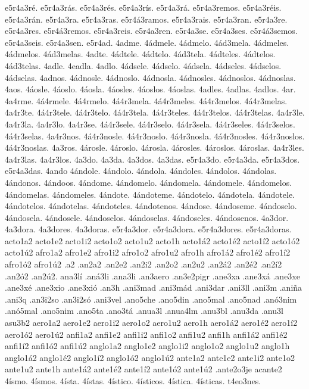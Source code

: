 {e5r4a3ré. e5r4a3rás. e5r4a3rés. e5r4a3rís. e5r4a3rá. e5r4a3remos. e5r4a3réis. e5r4a3rán.
e5r4a3ra. e5r4a3ras. e5r4á3ramos. e5r4a3rais. e5r4a3ran.
e5r4a3re. e5r4a3res. e5r4á3remos. e5r4a3reis. e5r4a3ren.
e5r4a3se. e5r4a3ses. e5r4á3semos. e5r4a3seis. e5r4a3sen.
e5r4ad.
4adme.
4ádmele. 4ádmelo. 4ád3mela.
4ádmeles. 4ádmelos. 4ád3melas.
4adte.
4ádtele. 4ádtelo. 4ád3tela.
4ádteles. 4ádtelos. 4ád3telas.
4adle. 4eadla. 4adlo.
4ádsele. 4ádselo. 4ádsela.
4ádseles. 4ádselos. 4ádselas.
4adnos.
4ádnosle. 4ádnoslo. 4ádnosla.
4ádnosles. 4ádnoslos. 4ádnoslas.
4aos.
4áosle. 4áoslo. 4áosla.
4áosles. 4áoslos. 4áoslas.
4adles. 4adlas. 4adlos.
4ar.
4a4rme.
4á4rmele. 4á4rmelo. 4á4r3mela.
4á4r3meles. 4á4r3melos. 4á4r3melas.
4a4r3te.
4á4r3tele. 4á4r3telo. 4á4r3tela.
4á4r3teles. 4á4r3telos. 4á4r3telas.
4a4r3le. 4a4r3la. 4a4r3lo.
4a4r3se.
4á4r3sele. 4á4r3selo. 4á4r3sela.
4á4r3seles. 4á4r3selos. 4á4r3selas.
4a4r3nos.
4á4r3nosle. 4á4r3noslo. 4á4r3nosla.
4á4r3nosles. 4á4r3noslos. 4á4r3noslas.
4a3ros.
4árosle. 4ároslo. 4árosla.
4árosles. 4ároslos. 4ároslas.
4a4r3les. 4a4r3las. 4a4r3los.
4a3do. 4a3da. 4a3dos. 4a3das.
e5r4a3do. e5r4a3da. e5r4a3dos. e5r4a3das.
4ando
4ándole. 4ándolo. 4ándola. 4ándoles. 4ándolos. 4ándolas.
4ándonos. 4ándoos.
4ándome. 4ándomelo. 4ándomela. 4ándomele.
4ándomelos. 4ándomelas. 4ándomeles.
4ándote. 4ándoteme.
4ándotelo. 4ándotela. 4ándotele.
4ándotelos. 4ándotelas. 4ándoteles.
4ándotenos.
4ándose. 4ándoseme.
4ándoselo. 4ándosela. 4ándosele.
4ándoselos. 4ándoselas. 4ándoseles.
4ándosenos.
4a3dor. 4a3dora. 4a3dores. 4a3doras.
e5r4a3dor. e5r4a3dora. e5r4a3dores. e5r4a3doras.
acto1a2 acto1e2 acto1i2 acto1o2 acto1u2 acto1h
acto1á2 acto1é2 acto1í2 acto1ó2 acto1ú2
afro1a2 afro1e2 afro1i2 afro1o2 afro1u2 afro1h
afro1á2 afro1é2 afro1í2 afro1ó2 afro1ú2
.a2 .an2a2 .an2e2 .an2i2 .an2o2 .an2u2
.an2á2 .an2é2 .an2í2 .an2ó2 .an2ú2.
ana3lí
.aná3li
.ana3li
.an3aero
.an3e2pigr
.ane3xa .ane3xá .ane3xe .ane3xé .ane3xio .ane3xió
.an3h
.ani3mad .ani3mád
.ani3dar
.ani3ll
.ani3m
.aniña
.ani3q
.an3i2so .an3i2só
.ani3vel
.ano5che
.ano5din
.ano5mal
.ano5nad
.anó3nim
.anó5mal
.ano5nim
.ano5ta .ano3tá
.anua3l
.anua4lm
.anu3bl
.anu3da
.anu3l
asu3b2
aero1a2 aero1e2 aero1i2 aero1o2 aero1u2 aero1h
aero1á2 aero1é2 aero1í2 aero1ó2 aero1ú2
anfi1a2 anfi1e2 anfi1i2 anfi1o2 anfi1u2 anfi1h
anfi1á2 anfi1é2 anfi1í2 anfi1ó2 anfi1ú2
anglo1a2 anglo1e2 anglo1i2 anglo1o2 anglo1u2 anglo1h
anglo1á2 anglo1é2 anglo1í2 anglo1ó2 anglo1ú2
ante1a2 ante1e2 ante1i2 ante1o2 ante1u2 ante1h
ante1á2 ante1é2 ante1í2 ante1ó2 ante1ú2
.ante2o3je
acante2
4ísmo. 4ísmos. 4ísta. 4ístas.
4ístico. 4ísticos. 4ística. 4ísticas.
t4eo3nes.
}
